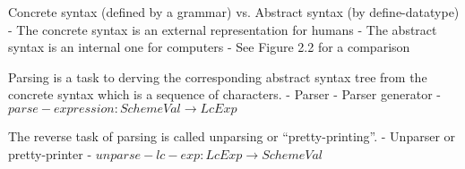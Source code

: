 \documentclass{article}
\newcommand{\mm}{\!\!-\!\!}
\begin{document}
\begin{huge}

Concrete syntax (defined by a grammar) vs. 
Abstract syntax (by define-datatype) \al
- The concrete syntax is an external representation for humans \al
- The abstract syntax is an internal one for computers \al
- See Figure 2.2 for a comparison

Parsing is a task to derving the corresponding abstract syntax tree from
the concrete syntax which is a sequence of characters. \al
- Parser \al
- Parser generator \al
- $parse\mm expression : SchemeVal \rightarrow LcExp$

The reverse task of parsing is called unparsing or ``pretty-printing''. \al
- Unparser or pretty-printer \al
- $unparse\mm lc\mm exp : LcExp \rightarrow SchemeVal$

\end{huge}
\end{document}
